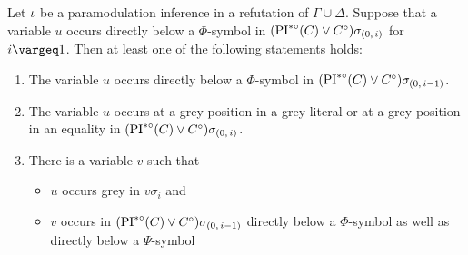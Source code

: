 \documentclass[,%
	draft=false,%
	numbers=noendperiod
	12pt,
	a4paper,
	oneside,%
	openany,
]{memoir}
\newcommand{\inv}{\ensuremath{\PIstarnosigma(C)\lor C\nosigma}}
\newcommand{\invp}{\ensuremath{(\inv)}}
\begin{document}
\begin{lemma}
	\label{lemma:var_below_phi_symbol_paramod}
	Let $\iota$ be a paramodulation inference in a refutation of $\Gamma\cup\Delta$.
	Suppose that a variable $u$ occurs directly below a $\Phi$-symbol in $\invp\sigmazi$ for $i\vargeq 1$.
	Then at least one of the following statements holds:
	\begin{enumerate}
		\item
			\label{15_1}
			The variable $u$ occurs directly below a $\Phi$-symbol in $\invp\sigmazmi$.

		\item
			\label{15_5}
			The variable $u$ occurs at a grey position in a grey literal or at a grey position in an equality in $\invp\sigmazi$.

		\item 
			\label{15_2}
			There is a variable $v$ such that 
			{
				\renewcommand{\labelitemi}{\textendash}
				\begin{itemize}
					\item $u$ occurs grey in $v\sigma_i$ and
					\item $v$ occurs in $\invp\sigmazmi$ directly below a $\Phi$-symbol as well as directly below a $\Psi$-symbol
				\end{itemize}
			}


	\end{enumerate}
\end{lemma}
\end{document}

